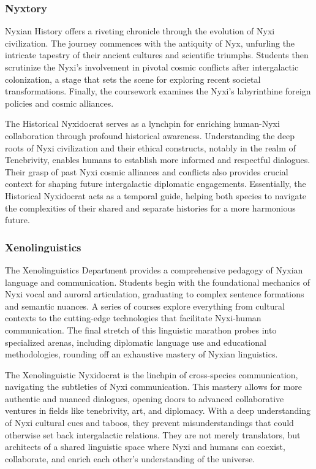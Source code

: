 \subsubsection{Nyxtory}
Nyxian History offers a riveting chronicle through the evolution of Nyxi
civilization. The journey commences with the antiquity of Nyx, unfurling the
intricate tapestry of their ancient cultures and scientific triumphs. Students
then scrutinize the Nyxi's involvement in pivotal cosmic conflicts after
intergalactic colonization, a stage that sets the scene for exploring recent
societal transformations. Finally, the coursework examines the Nyxi's
labyrinthine foreign policies and cosmic alliances.

The Historical Nyxidocrat serves as a lynchpin for enriching human-Nyxi
collaboration through profound historical awareness. Understanding the deep
roots of Nyxi civilization and their ethical constructs, notably in the realm
of Tenebrivity, enables humans to establish more informed and respectful
dialogues. Their grasp of past Nyxi cosmic alliances and conflicts also
provides crucial context for shaping future intergalactic diplomatic
engagements. Essentially, the Historical Nyxidocrat acts as a temporal guide,
helping both species to navigate the complexities of their shared and separate
histories for a more harmonious future.

\subsubsection{Xenolinguistics}
The Xenolinguistics Department provides a comprehensive pedagogy of Nyxian
language and communication. Students begin with the foundational mechanics of
Nyxi vocal and auroral articulation, graduating to complex sentence formations
and semantic nuances. A series of courses explore everything from cultural
contexts to the cutting-edge technologies that facilitate Nyxi-human
communication. The final stretch of this linguistic marathon probes into
specialized arenas, including diplomatic language use and educational
methodologies, rounding off an exhaustive mastery of Nyxian linguistics.

The Xenolinguistic Nyxidocrat is the linchpin of cross-species communication,
navigating the subtleties of Nyxi communication. This mastery allows for more
authentic and nuanced dialogues, opening doors to advanced collaborative
ventures in fields like tenebrivity, art, and diplomacy. With a deep
understanding of Nyxi cultural cues and taboos, they prevent misunderstandings
that could otherwise set back intergalactic relations. They are not merely
translators, but architects of a shared linguistic space where Nyxi and humans
can coexist, collaborate, and enrich each other's understanding of the
universe.

